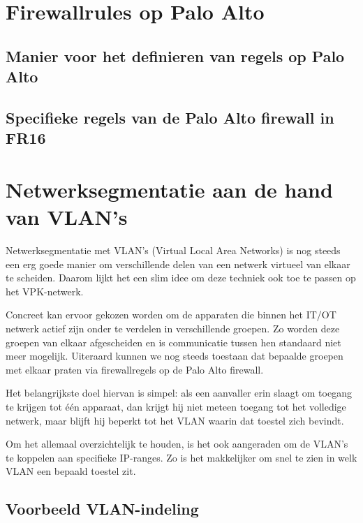 \section{Firewallrules op Palo Alto}
\subsection{Manier voor het definieren van regels op Palo Alto}
\subsection{Specifieke regels van de Palo Alto firewall in FR16}

\section{Netwerksegmentatie aan de hand van VLAN’s}

Netwerksegmentatie met VLAN’s (Virtual Local Area Networks) is nog steeds een erg goede manier om verschillende delen van een netwerk virtueel van elkaar te scheiden. Daarom lijkt het een slim idee om deze techniek ook toe te passen op het VPK-netwerk.

Concreet kan ervoor gekozen worden om de apparaten die binnen het IT/OT netwerk actief zijn onder te verdelen in verschillende groepen. Zo worden deze groepen van elkaar afgescheiden en is communicatie tussen hen standaard niet meer mogelijk. Uiteraard kunnen we nog steeds toestaan dat bepaalde groepen met elkaar praten via firewallregels op de Palo Alto firewall.

Het belangrijkste doel hiervan is simpel: als een aanvaller erin slaagt om toegang te krijgen tot één apparaat, dan krijgt hij niet meteen toegang tot het volledige netwerk, maar blijft hij beperkt tot het VLAN waarin dat toestel zich bevindt.

Om het allemaal overzichtelijk te houden, is het ook aangeraden om de VLAN’s te koppelen aan specifieke IP-ranges. Zo is het makkelijker om snel te zien in welk VLAN een bepaald toestel zit.

\subsection*{Voorbeeld VLAN-indeling}

